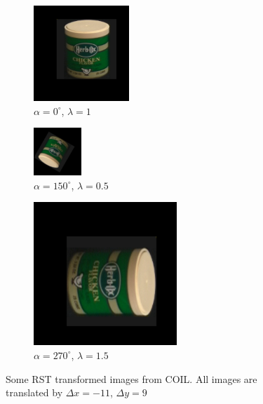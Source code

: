 \begin{figure}[tbp]
	\begin{subfigure}{0.29\textwidth}
        \centering
    \includegraphics[width=102pt]{figures/coil_rst/26x-11y9r0s1_0.png}
    \caption{$\alpha=0^{\circ}$, $\lambda=1$}
	\end{subfigure}
	\begin{subfigure}{0.28\textwidth}
        \centering
    \includegraphics[width=51pt]{figures/coil_rst/26x-11y9r150s0_5.png}
    \caption{$\alpha=150^{\circ}$, $\lambda=0.5$}
	\end{subfigure}
	\begin{subfigure}{0.40\textwidth}
        \centering
    \includegraphics[width=153pt]{figures/coil_rst/26x-11y9r270s1_75.png}
    \caption{$\alpha=270^{\circ}$, $\lambda=1.5$}
	\end{subfigure}
	\caption{Some RST transformed images from COIL. All images are translated by $\Delta x = -11$, $\Delta y = 9$}
	\label{fig:coil_rst}
\end{figure}



